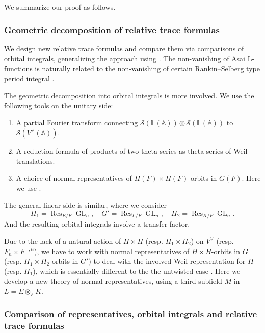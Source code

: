 \documentclass[11pt, reqno]{amsart}
\numberwithin{equation}{subsection}
\theoremstyle{plain}
\theoremstyle{definition}
\newcommand{\BL}{\mathbb L}
\newcommand{\CS}{\mathcal{S}}
\DeclareMathOperator{\GL}{GL}
\DeclareMathOperator{\Res}{Res}
\begin{document}
We summarize our proof as follows.

\begin{figure}[omitted: a diagram of this paper's results, not reproduced here]\end{figure}

\subsubsection{Geometric decomposition of relative trace formulas}

We design new relative trace formulas and compare them via comparisons of orbital integrals, generalizing the approach \cite{Liu2014relative,Xue-GGP,Xue-Ichino,TGGP-Wang} using \cite{JPSS1983}. The non-vanishing of Asai L-functions is naturally related to the non-vanishing of certain Rankin–Selberg type period integral \cite{Flicker}.

The geometric decomposition into orbital integrals is more involved. We use the following tools on the unitary side:
\begin{enumerate}
    \item A partial Fourier transform connecting $\CS(\BL(\mathbb A)) \otimes \CS(\BL(\mathbb A))$ to $\CS(V^\vee(\mathbb A))$.
    \item A reduction formula of products of two theta series as theta series of Weil translations.
    \item A choice of normal representatives of $H(F) \times H(F)$ orbits in $G(F)$. Here we use \cite[Lemma 8.8]{Kottwitz1980}.
\end{enumerate} 
The general linear side is similar, where we consider 
\[
H_1 = \Res_{E/F} \GL_n, \quad G' = \Res_{L/F} \GL_n, \quad H_2 = \Res_{K/F} \GL_n.
\]
And the resulting orbital integrals involve a transfer factor.

 Due to the lack of a natural action of $H \times H$ (resp. $H_1 \times H_2$) on $V^\vee$  (resp. $F_n \times F^{-,n}$), we have to work with normal representatives of $H \times H$-orbits in $G$ (resp. $H_1 \times H_2$-orbits in $G'$) to deal with the involved Weil representation for $H$ (resp. $H_1$), which is essentially different to the the untwisted case \cite{Xue-GGP}. Here we develop a new theory of normal representatives, using a third subfield $M$ in $L=E \otimes_F K$.








\subsubsection{Comparison of representatives, orbital integrals and relative trace formulas}
\end{document}
